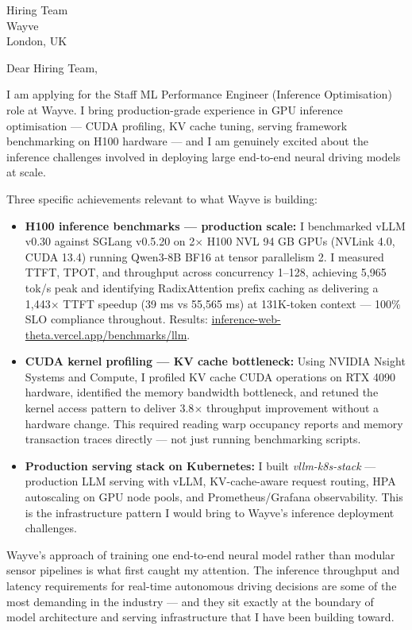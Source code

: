 \documentclass[12pt,a4paper]{letter}
\date{\today}
\begin{document}
\begin{letter}{Hiring Team \\ Wayve \\ London, UK}

\opening{Dear Hiring Team,}

I am applying for the Staff ML Performance Engineer (Inference Optimisation) role at Wayve. I bring production-grade experience in GPU inference optimisation — CUDA profiling, KV cache tuning, serving framework benchmarking on H100 hardware — and I am genuinely excited about the inference challenges involved in deploying large end-to-end neural driving models at scale.

Three specific achievements relevant to what Wayve is building:

\begin{itemize}
  \item \textbf{H100 inference benchmarks — production scale:} I benchmarked vLLM v0.30 against SGLang v0.5.20 on 2$\times$ H100 NVL 94 GB GPUs (NVLink 4.0, CUDA 13.4) running Qwen3-8B BF16 at tensor parallelism 2. I measured TTFT, TPOT, and throughput across concurrency 1--128, achieving 5,965 tok/s peak and identifying RadixAttention prefix caching as delivering a 1,443$\times$ TTFT speedup (39 ms vs 55,565 ms) at 131K-token context — 100\% SLO compliance throughout. Results: \href{https://inference-web-theta.vercel.app/benchmarks/llm}{inference-web-theta.vercel.app/benchmarks/llm}.

  \item \textbf{CUDA kernel profiling — KV cache bottleneck:} Using NVIDIA Nsight Systems and Compute, I profiled KV cache CUDA operations on RTX 4090 hardware, identified the memory bandwidth bottleneck, and retuned the kernel access pattern to deliver 3.8$\times$ throughput improvement without a hardware change. This required reading warp occupancy reports and memory transaction traces directly — not just running benchmarking scripts.

  \item \textbf{Production serving stack on Kubernetes:} I built \textit{vllm-k8s-stack} — production LLM serving with vLLM, KV-cache-aware request routing, HPA autoscaling on GPU node pools, and Prometheus/Grafana observability. This is the infrastructure pattern I would bring to Wayve's inference deployment challenges.
\end{itemize}

Wayve's approach of training one end-to-end neural model rather than modular sensor pipelines is what first caught my attention. The inference throughput and latency requirements for real-time autonomous driving decisions are some of the most demanding in the industry — and they sit exactly at the boundary of model architecture and serving infrastructure that I have been building toward.


\end{letter}
\end{document}
